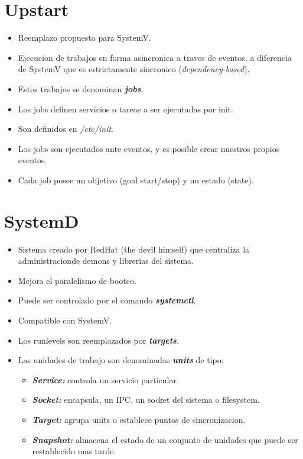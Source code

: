 \documentclass[11pt]{article}
\begin{document}
\section{Upstart}
\begin{itemize}
    \item Reemplazo propuesto para SystemV.
    \item Ejecucion de trabajos en forma asincronica a traves de eventos, a diferencia de SystemV que es estrictamente sincronico (\textit{dependency-based}).
    \item Estos trabajos se denominan \textbf{\textit{jobs}}.
    \item Los jobs definen servicios o tareas a ser ejecutadas por init.
    \item Son definidos en \textit{/etc/init}.
    \item Los jobs son ejecutados ante eventos, y es posible crear nuestros propios eventos.
    \item Cada job posee un objetivo (goal start/stop) y un estado (state).
\end{itemize}


\section{SystemD}

\begin{itemize}
    \item Sistema creado por RedHat (the devil himself) que centraliza la administracionde demons y librerias del sistema.
    \item Mejora el paralelismo de booteo.
    \item Puede ser controlado por el comando \textbf{\textit{systemctl}}.
    \item Compatible con SystemV.
    \item Los runlevels son reemplazados por \textbf{\textit{targets}}.
    \item Las unidades de trabajo son denominadas \textbf{\textit{units}} de tipo:
    \begin{itemize}
        \item \textbf{\textit{Service:}} controla un servicio particular.
        \item \textbf{\textit{Socket:}} encapsula, un IPC, un socket del sistema o filesystem.
        \item \textbf{\textit{Target:}} agrupa units o establece puntos de sincronizacion.
        \item \textbf{\textit{Snapshot:}} almacena el estado de un conjunto de unidades que puede ser restablecido mas tarde.
    \end{itemize}
\end{itemize}
\end{document}
